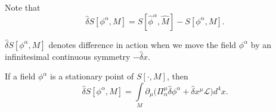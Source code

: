 \documentclass[main.tex]{subfiles}
\begin{document}
Note that
\begin{equation}
\hat{\delta}S[\phi^\alpha, M] = S[\hat{\phi}^\alpha, \hat{M}] - S[\phi^\alpha, M]. 
\end{equation}

$\hat{\delta}S[\phi^\alpha, M]$ denotes difference in action when we move the field $\phi^\alpha$ by an infinitesimal continuous symmetry $-\hat{\delta} x$.

\begin{lemma}
\label{noether-variation}
If a field $\phi^\alpha$ is a stationary point of $S[ \cdot, M]$, then
\begin{equation}
\hat{\delta}S[\phi^\alpha, M] = \int\limits_M \partial_\mu \bigg( \Pi_\alpha^\mu \hat{\delta} \phi^\alpha + \hat{\delta}x^\mu \mathcal{L} \bigg)d^4 x.
\end{equation}
\end{lemma}
\end{document}
